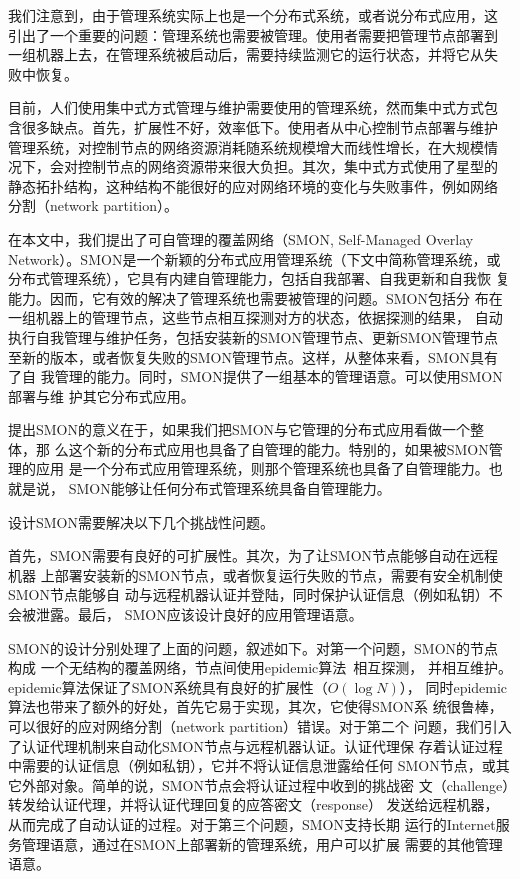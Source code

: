 我们注意到，由于管理系统实际上也是一个分布式系统，或者说分布式应用，这
引出了一个重要的问题：管理系统也需要被管理。使用者需要把管理节点部署到
一组机器上去，在管理系统被启动后，需要持续监测它的运行状态，并将它从失
败中恢复。


目前，人们使用集中式方式管理与维护需要使用的管理系统，然而集中式方式包
含很多缺点。首先，扩展性不好，效率低下。使用者从中心控制节点部署与维护
管理系统，对控制节点的网络资源消耗随系统规模增大而线性增长，在大规模情
况下，会对控制节点的网络资源带来很大负担。其次，集中式方式使用了星型的
静态拓扑结构，这种结构不能很好的应对网络环境的变化与失败事件，例如网络
分割（network partition）。


在本文中，我们提出了可自管理的覆盖网络（SMON, Self-Managed Overlay
Network）。SMON是一个新颖的分布式应用管理系统（下文中简称管理系统，或
分布式管理系统），它具有内建自管理能力，包括自我部署、自我更新和自我恢
复能力。因而，它有效的解决了管理系统也需要被管理的问题。SMON包括分
布在一组机器上的管理节点，这些节点相互探测对方的状态，依据探测的结果，
自动执行自我管理与维护任务，包括安装新的SMON管理节点、更新SMON管理节点
至新的版本，或者恢复失败的SMON管理节点。这样，从整体来看，SMON具有了自
我管理的能力。同时，SMON提供了一组基本的管理语意。可以使用SMON部署与维
护其它分布式应用。

提出SMON的意义在于，如果我们把SMON与它管理的分布式应用看做一个整体，那
么这个新的分布式应用也具备了自管理的能力。特别的，如果被SMON管理的应用
是一个分布式应用管理系统，则那个管理系统也具备了自管理能力。也就是说，
SMON能够让任何分布式管理系统具备自管理能力。

设计SMON需要解决以下几个挑战性问题。

首先，SMON需要有良好的可扩展性。其次，为了让SMON节点能够自动在远程机器
上部署安装新的SMON节点，或者恢复运行失败的节点，需要有安全机制使SMON节点能够自
动与远程机器认证并登陆，同时保护认证信息（例如私钥）不会被泄露。最后，
SMON应该设计良好的应用管理语意。

SMON的设计分别处理了上面的问题，叙述如下。对第一个问题，SMON的节点构成
一个无结构的覆盖网络，节点间使用epidemic算法~\cite{Demers1987}相互探测，
并相互维护。epidemic算法保证了SMON系统具有良好的扩展性（$O(\log N)$），
同时epidemic算法也带来了额外的好处，首先它易于实现，其次，它使得SMON系
统很鲁棒，可以很好的应对网络分割（network partition）错误。对于第二个
问题，我们引入了认证代理机制来自动化SMON节点与远程机器认证。认证代理保
存着认证过程中需要的认证信息（例如私钥），它并不将认证信息泄露给任何
SMON节点，或其它外部对象。简单的说，SMON节点会将认证过程中收到的挑战密
文（challenge）转发给认证代理，并将认证代理回复的应答密文（response）
发送给远程机器，从而完成了自动认证的过程。对于第三个问题，SMON支持长期
运行的Internet服务管理语意，通过在SMON上部署新的管理系统，用户可以扩展
需要的其他管理语意。

